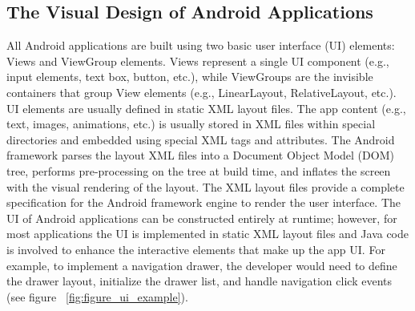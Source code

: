 \subsection{The Visual Design of Android Applications}
All Android applications are built using two basic user interface (UI) elements: Views and ViewGroup elements.
Views represent a single UI component (e.g., input elements, text box, button, etc.), while ViewGroups are the invisible containers that group View elements (e.g., LinearLayout, RelativeLayout, etc.).
UI elements are usually defined in static XML layout files. The app content (e.g., text, images, animations, etc.) is usually stored in XML files within special directories and embedded using special XML tags and attributes.
The Android framework parses the layout XML files into a Document Object Model (DOM) tree, performs pre-processing on the tree at build time, and inflates the screen with the visual rendering of the layout.
The XML layout files provide a complete specification for the Android framework engine to render the user interface.
The UI of Android applications can be constructed entirely at runtime; however, for most applications the UI is implemented in static XML layout files and Java code is involved to enhance the interactive elements that make up the app UI.
For example, to implement a navigation drawer, the developer would need to define the drawer layout, initialize the drawer list, and handle navigation click events (see figure ~\ref{fig:figure_ui_example}).


